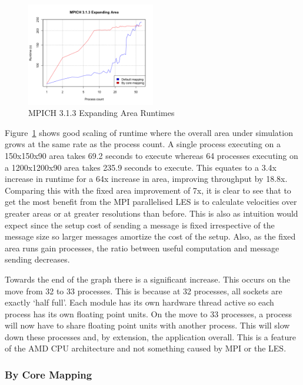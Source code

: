 \begin{figure}
    \includegraphics[width=0.5\textwidth]{graphs/MPICH313-expanding-area.png}
    \caption{MPICH 3.1.3 Expanding Area Runtimes}
    \label{fig:mpichexpandingarea}
\end{figure}

Figure~\ref{fig:mpichexpandingarea} shows good scaling of runtime where the
overall area under simulation grows at the same rate as the process count. A
single process executing on a 150x150x90 area takes 69.2 seconds to execute
whereas 64 processes executing on a 1200x1200x90 area takes 235.9 seconds to
execute. This equates to a 3.4x increase in runtime for a 64x increase in area,
improving throughput by 18.8x. Comparing this with the fixed area improvement of
7x, it is clear to see that to get the most benefit from the MPI parallelised
LES is to calculate velocities over greater areas or at greater resolutions than
before. This is also as intuition would expect since the setup cost of sending a
message is fixed irrespective of the message size so larger messages amortize
the cost of the setup. Also, as the fixed area runs gain processes, the ratio
between useful computation and message sending decreases.

Towards the end of the graph there is a significant increase. This occurs on the
move from 32 to 33 processes. This is because at 32 processes, all sockets are
exactly `half full'. Each module has its own hardware thread active so each
process has its own floating point units. On the move to 33 processes, a process
will now have to share floating point units with another process. This will slow
down these processes and, by extension, the application overall. This is a
feature of the AMD CPU architecture and not something caused by MPI or the LES.

\subsubsection{By Core Mapping}


